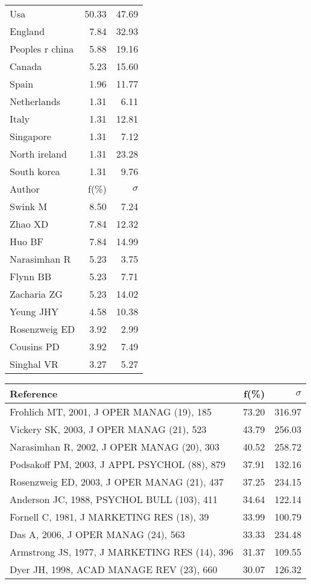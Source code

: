 \documentclass[a4paper,11pt]{report}
\begin{document}
\begin{landscape}
\begin{table}[!ht]
{\begin{tabular}{|l r r|}
Usa & 50.33 & 47.69\\
England & 7.84 & 32.93\\
Peoples r china & 5.88 & 19.16\\
Canada & 5.23 & 15.60\\
Spain & 1.96 & 11.77\\
Netherlands & 1.31 & 6.11\\
Italy & 1.31 & 12.81\\
Singapore & 1.31 & 7.12\\
North ireland & 1.31 & 23.28\\
South korea & 1.31 & 9.76\\
\hline
\hline
Author & f(\%) & $\sigma$\\
\hline
Swink M & 8.50 & 7.24\\
Zhao XD & 7.84 & 12.32\\
Huo BF & 7.84 & 14.99\\
Narasimhan R & 5.23 & 3.75\\
Flynn BB & 5.23 & 7.71\\
Zacharia ZG & 5.23 & 14.02\\
Yeung JHY & 4.58 & 10.38\\
Rosenzweig ED & 3.92 & 2.99\\
Cousins PD & 3.92 & 7.49\\
Singhal VR & 3.27 & 5.27\\
\hline
\end{tabular}
}
{\scriptsize\begin{tabular}{|l r r|}
\hline
Reference & f(\%) & $\sigma$\\
\hline
Frohlich MT, 2001, J OPER MANAG (19), 185 & 73.20 & 316.97\\
Vickery SK, 2003, J OPER MANAG (21), 523 & 43.79 & 256.03\\
Narasimhan R, 2002, J OPER MANAG (20), 303 & 40.52 & 258.72\\
Podsakoff PM, 2003, J APPL PSYCHOL (88), 879 & 37.91 & 132.16\\
Rosenzweig ED, 2003, J OPER MANAG (21), 437 & 37.25 & 234.15\\
Anderson JC, 1988, PSYCHOL BULL (103), 411 & 34.64 & 122.14\\
Fornell C, 1981, J MARKETING RES (18), 39 & 33.99 & 100.79\\
Das A, 2006, J OPER MANAG (24), 563 & 33.33 & 234.48\\
Armstrong JS, 1977, J MARKETING RES (14), 396 & 31.37 & 109.55\\
Dyer JH, 1998, ACAD MANAGE REV (23), 660 & 30.07 & 126.32\\

\end{tabular}}
\end{table}
\end{landscape}
\end{document}
